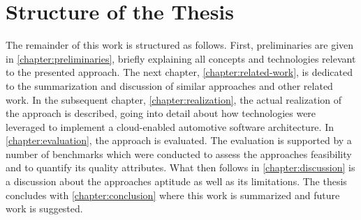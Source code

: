 %
%
%
%
%
%
%
%
%
%


\section{Structure of the Thesis}

The remainder of this work is structured as follows. First, preliminaries are given in \autoref{chapter:preliminaries}, briefly explaining all concepts and technologies relevant to the presented approach. The next chapter, \autoref{chapter:related-work}, is dedicated to the summarization and discussion of similar approaches and other related work. In the subsequent chapter, \autoref{chapter:realization}, the actual realization of the approach is described, going into detail about how technologies were leveraged to implement a cloud-enabled automotive software architecture. In \autoref{chapter:evaluation}, the approach is evaluated. The evaluation is supported by a number of benchmarks which were conducted to assess the approaches feasibility and to quantify its quality attributes. What then follows in \autoref{chapter:discussion} is a discussion about the approaches aptitude as well as its limitations. The thesis concludes with \autoref{chapter:conclusion} where this work is summarized and future work is suggested.

%
%
%
%
%
%
%
%
%
%
%
%
%
%
%
%
%
%
%
%
%
%
%
%
%
%
%
%
%
%
%
%
%
%
%
%
%
%

